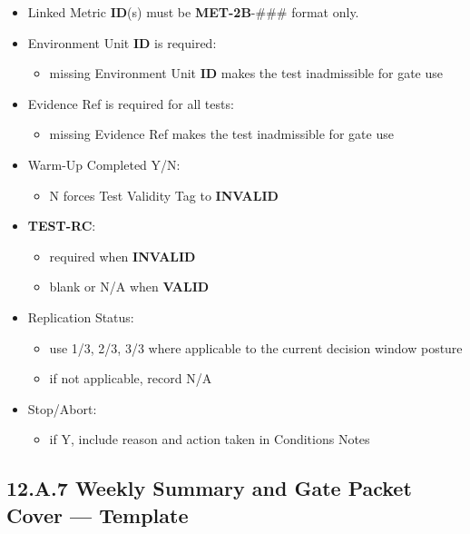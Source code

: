 \documentclass[10pt]{article}
\begin{document}
\begin{landscape}
\begin{itemize}
\item Linked Metric \textbf{ID}(s) must be \textbf{MET-2B}-\#\#\# format only.
\item Environment Unit \textbf{ID} is required:
  \begin{itemize}
  \item missing Environment Unit \textbf{ID} makes the test inadmissible for gate use
  \end{itemize}
\item Evidence Ref is required for all tests:
  \begin{itemize}
  \item missing Evidence Ref makes the test inadmissible for gate use
  \end{itemize}
\item Warm-Up Completed Y/N:
  \begin{itemize}
  \item N forces Test Validity Tag to \textbf{INVALID}
  \end{itemize}
\item \textbf{TEST-RC}:
  \begin{itemize}
  \item required when \textbf{INVALID}
  \item blank or N/A when \textbf{VALID}
  \end{itemize}
\item Replication Status:
  \begin{itemize}
  \item use 1/3, 2/3, 3/3 where applicable to the current decision window posture
  \item if not applicable, record N/A
  \end{itemize}
\item Stop/Abort:
  \begin{itemize}
  \item if Y, include reason and action taken in Conditions Notes
  \end{itemize}
\end{itemize}

\newpage

\subsection*{12.A.7 Weekly Summary and Gate Packet Cover — Template}
{}


\end{landscape}
\end{document}
